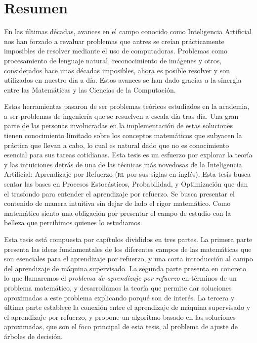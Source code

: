
\chapter*{Resumen}
En las últimas décadas, avances en el campo conocido como Inteligencia
Artificial nos han forzado a revaluar problemas que antres se creían
prácticamente imposibles de resolver mediante el uso de computadoras. Problemas
como procesamiento de lenguaje natural, reconocimiento de imágenes y otros,
considerados hace unas décadas imposibles, ahora es posible resolver y son
utilizados en nuestro día a día. Estos avances se han dado gracias a la sinergia
entre las Matemáticas y las Ciencias de la Computación.

Estas herramientas pasaron de ser problemas teóricos estudiados en la academia,
a ser problemas de ingeniería que se resuelven a escala día tras día. Una gran
parte de las personas involucradas en la implementación de estas soluciones
tienen conocimiento limitado sobre los conceptos matemáticos que subyacen la
práctica que llevan a cabo, lo cual es natural dado que no es conocimiento
esencial para sus tareas cotidianas. Esta tesis es un esfuerzo por explorar la
teoría y las intuiciones detrás de una de las técnicas más novedosas de la
Inteligencia Artificial: Aprendizaje por Refuerzo (\textsc{rl} por sus siglas en
inglés). Esta tesis busca sentar las bases en Procesos Estocásticos,
Probabilidad, y Optimización que dan el trasfondo para entender el aprendizaje
por refuerzo. Se busca presentar el contenido de manera intuitiva sin dejar de
lado el rigor matemático. Como matemático siento una obligación por presentar el
campo de estudio con la belleza que percibimos quienes lo estudiamos.

Esta tesis está compuesta por capítulos divididos en tres partes. La primera
parte presenta las ideas fundamentales de los diferentes campos de las
matemáticas que son esenciales para el aprendizaje por refuerzo, y una corta
introducción al campo del aprendizaje de máquina supervisado. La segunda parte
presenta en concreto lo que llamaremos el \emph{problema de aprendizaje por
refuerzo} en términos de un problema matemático, y desarrollamos la teoría que
permite dar soluciones aproximadas a este problema explicando porqué son de
interés. La tercera y última parte establece la conexión entre el aprendizaje de
máquina supervisado y el aprendizaje por refuerzo, y propone un algoritmo basado
en las soluciones aproximadas, que son el foco principal de esta tesis, al
problema de ajuste de árboles de decisión.

